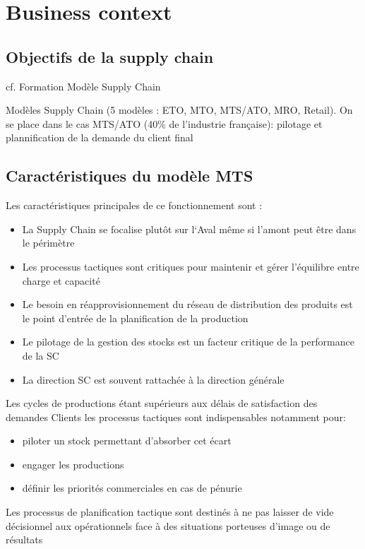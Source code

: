 \chapter{Business context}
\label{chap:business-context}


\section{Objectifs de la supply chain}

cf. Formation Modèle Supply Chain

Modèles Supply Chain (5 modèles : ETO, MTO, MTS/ATO, MRO, Retail).
On se place dans le cas MTS/ATO (40\% de l'industrie française): pilotage et plannification de la demande du client final

\section{Caractéristiques du modèle MTS}

Les caractéristiques principales de ce fonctionnement sont :
\begin{itemize}
  \item La Supply Chain se focalise plutôt sur l‘Aval même si l’amont peut être dans  le périmètre
  \item Les processus tactiques sont critiques pour maintenir et gérer l’équilibre entre charge et capacité
  \item Le besoin en réapprovisionnement du réseau de distribution des produits est le point d’entrée de la planification de la production
  \item Le pilotage de la gestion des stocks est un facteur critique de la performance de la SC
  \item La direction SC est souvent rattachée à la direction générale
\end{itemize}


Les cycles de productions étant supérieurs aux délais de satisfaction des demandes Clients les processus tactiques sont indispensables notamment pour:
\begin{itemize}
  \item piloter un stock permettant d'absorber cet écart
  \item engager les productions 
  \item définir les priorités commerciales en cas de pénurie
\end{itemize}

Les processus de planification tactique sont destinés à ne pas laisser de vide décisionnel aux opérationnels face à des situations porteuses d'image ou de résultats 

